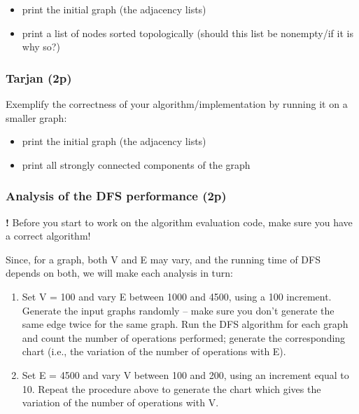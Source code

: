 \documentclass[../en-fa-lab.tex]{subfiles}
\begin{document}
\begin{itemize}
\item
  print the initial graph (the adjacency lists)
\item
  print a list of nodes sorted topologically (should this list be
  nonempty/if it is why so?)
\end{itemize}

\subsubsection{Tarjan (2p)}\label{tarjan-2p}

Exemplify the correctness of your algorithm/implementation by running it
on a smaller graph:

\begin{itemize}
\item
  print the initial graph (the adjacency lists)
\item
  print all strongly connected components of the graph
\end{itemize}

\subsubsection{Analysis of the DFS performance
(2p)}\label{analysis-of-the-dfs-performance-2p}

\textbf{!} Before you start to work on the algorithm evaluation code,
make sure you have a correct algorithm!

Since, for a graph, both \textbar V\textbar{} and \textbar E\textbar{}
may vary, and the running time of DFS depends on both, we will make each
analysis in turn:

\begin{enumerate}
\def\labelenumi{\arabic{enumi}.}
\item
  Set \textbar V\textbar{} = 100 and vary \textbar E\textbar{} between
  1000 and 4500, using a 100 increment. Generate the input graphs
  randomly -- make sure you don't generate the same edge twice for the
  same graph. Run the DFS algorithm for each graph and count the number
of operations performed; generate the corresponding chart (i.e., the variation of the number of operations with \textbar E\textbar).
\item
  Set \textbar E\textbar{} = 4500 and vary \textbar V\textbar{} between
  100 and 200, using an increment equal to 10. Repeat the procedure
  above to generate the chart which gives the variation of the number of
  operations with \textbar V\textbar.
\end{enumerate}
\end{document}
